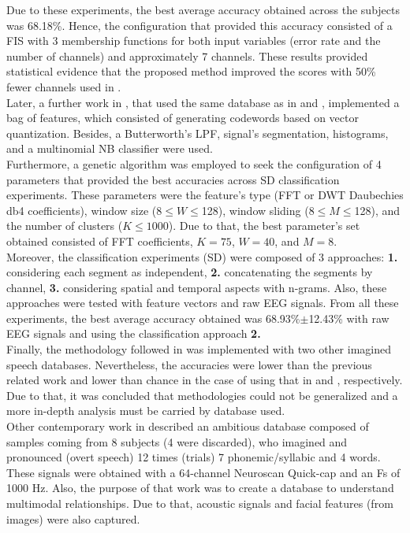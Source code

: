 Due to these experiments, the best average accuracy obtained across the subjects was 68.18\%. Hence, the configuration that provided this accuracy consisted of a FIS with 3 membership functions for both input variables (error rate and the number of channels) and approximately 7 channels. These results provided statistical evidence that the proposed method improved the scores with 50\% fewer channels used in \cite{torres2013analisis}.\\

Later, a further work in \cite{salinas2017bag}, that used the same database as in \cite{torres2013analisis} and \cite{torres2016implementing}, implemented a bag of features, which consisted of generating codewords based on vector quantization. Besides, a Butterworth's LPF, signal's segmentation, histograms, and a multinomial NB classifier were used.\\

Furthermore, a genetic algorithm was employed to seek the configuration of 4 parameters that provided the best accuracies across SD classification experiments. These parameters were the feature's type (FFT or DWT Daubechies db4 coefficients), window size ($8\leq W \leq$128), window sliding ($8\leq M \leq$128), and the number of clusters ($K\leq 1000$). Due to that, the best parameter's set obtained consisted of FFT coefficients, $K=75$, $W=40$, and $M=8$.\\

Moreover, the classification experiments (SD) were composed of 3 approaches: \textbf{1.} considering each segment as independent, \textbf{2.} concatenating the segments by channel, \textbf{3.} considering spatial and temporal aspects with n-grams. Also, these approaches were tested with feature vectors and raw EEG signals. From all these experiments, the best average accuracy obtained was 68.93\%$\pm$12.43\% with raw EEG signals and using the classification approach \textbf{2.}\\

Finally, the methodology followed in \cite{salinas2017bag} was implemented with two other imagined speech databases. Nevertheless, the accuracies were lower than the previous related work and lower than chance in the case of using that in \cite{coretto2017open} and \cite{zhao2015classifying}, respectively. Due to that, it was concluded that methodologies could not be generalized and a more in-depth analysis must be carried by database used.\\

Other contemporary work in \cite{zhao2015classifying} described an ambitious database composed of samples coming from 8 subjects (4 were discarded), who imagined and pronounced (overt speech) 12 times (trials) 7 phonemic/syllabic and 4 words. These signals were obtained with a 64-channel Neuroscan Quick-cap and an Fs of 1000 Hz. Also, the purpose of that work was to create a database to understand multimodal relationships. Due to that, acoustic signals and facial features (from images) were also captured.\\

